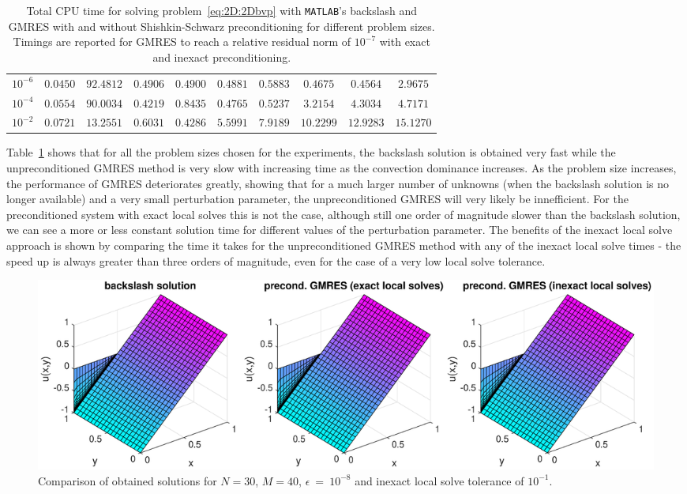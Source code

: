 \begin{table}[tbhp]
\begin{tabular}{r|ccccccccc}
\multicolumn{1}{c|}{$10^{-6}$} & $0.0450$ & $92.4812$  & $0.4906$  & $0.4900$   & $0.4881$ & $0.5883$  & $0.4675$  & $0.4564$  & $2.9675$\\
\multicolumn{1}{c|}{$10^{-4}$} & $0.0554$ & $90.0034$  & $0.4219$  & $0.8435$   & $0.4765$ & $0.5237$  & $3.2154$  & $4.3034$  & $4.7171$\\
\multicolumn{1}{c|}{$10^{-2}$} & $0.0721$ &  $13.2551$  & $0.6031$  &  $0.4286$   & $5.5991$ & $7.9189$ & $10.2299$ & $12.9283$ & $15.1270$\\
\end{tabular}
\caption{Total CPU time for solving problem~\eqref{eq:2D:2Dbvp} with \texttt{MATLAB}'s backslash and GMRES with and without Shishkin-Schwarz preconditioning for different problem sizes. Timings are reported for GMRES to reach a relative residual norm of $10^{-7}$ with exact and inexact preconditioning.}
\label{tab:2D:GMRES.time.inexact.prec}
\end{table}

Table~\ref{tab:2D:GMRES.time.inexact.prec} shows that for all the problem sizes chosen for the experiments, the backslash solution is obtained very fast while the unpreconditioned GMRES method is very slow with increasing time as the convection dominance increases. As the problem size increases, the performance of GMRES deteriorates greatly, showing that for a much larger number of unknowns (when the backslash solution is no longer available) and a very small perturbation parameter, the unpreconditioned GMRES will very likely be innefficient. For the preconditioned system with exact local solves this is not the case, although still one order of magnitude slower than the backslash solution, we can see a more or less constant solution time for different values of the perturbation parameter. The benefits of the inexact local solve approach is shown by comparing the time it takes for the unpreconditioned GMRES method with any of the inexact local solve times -  the speed up is always greater than three orders of magnitude, even for the case of a very low local solve tolerance.
%
\begin{figure}[h!]
\hspace{-1cm}
\centering
\begin{minipage}[t]{0.99\linewidth}
\centering
\includegraphics[width=0.98\linewidth]{figures/sol_comp}
\end{minipage}
\caption{Comparison of obtained solutions for $N=30$, $M=40$, $\epsilon~=~10^{-8}$ and inexact local solve tolerance of $10^{-1}$.}
\label{fig:2D:sol_comp}
\end{figure}

